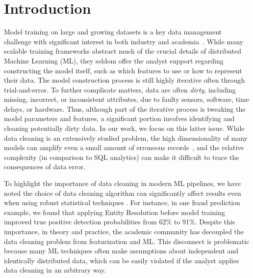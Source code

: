 \section{Introduction}\sloppy
Model training on large and growing datasets is a key data management challenge with significant interest in both industry and academia~\cite{bdas, alexandrov2014stratosphere, crotty2014tupleware, tensor}.
While many scalable training frameworks abstract much of the crucial details of distributed Machine Learning (ML), they seldom offer the analyst support regarding constructing the model itself, such as which features to use or how to represent their data.
The model construction process is still highly iterative often through trial-and-error. 
To further complicate matters, data are often \emph{dirty}, including missing, incorrect, or inconsistent attributes, due to faulty sensors, software, time delays, or hardware.
Thus, although part of the iterative process is tweaking the model parameters and features, a significant portion involves identifying and cleaning potentially dirty data.  
In our work, we focus on this latter issue. 
While data cleaning is an extensively studied problem, the high dimensionality of many models can amplify even a small amount of erroneous records~\cite{xiaofeature}, and the relative complexity (in comparison to SQL analytics) can make it difficult to trace the consequences of data error.

To highlight the importance of data cleaning in modern ML pipelines, we have noted the choice of data cleaning algorithm can significantly affect results even when using robust statistical techniques \cite{activecleanarxiv, DBLP:conf/case/MahlerKLSMKPWFAG14}.
For instance, in one fraud prediction example, we found that applying Entity Resolution before model training improved true positive detection probabilities from 62\% to 91\%. 
Despite this importance, in theory and practice, the academic community has decoupled the data cleaning problem from featurization and ML.
This disconnect is problematic because many ML techniques often make assumptions about independent and identically distributed data, which can be easily violated if the analyst applies data cleaning in an arbitrary way.

